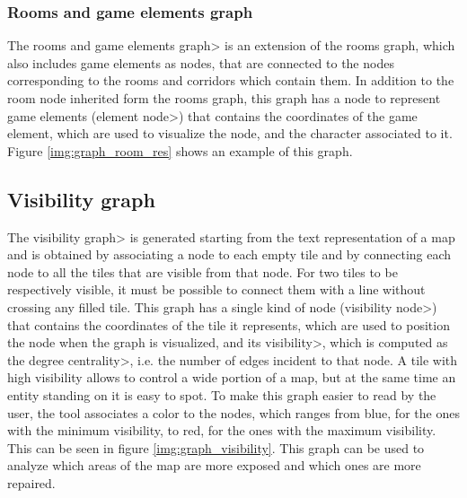\subsubsection{Rooms and game elements graph}

The \<rooms and game elements graph> is an extension of the rooms graph, which also includes game elements as nodes, that are connected to the nodes corresponding to the rooms and corridors which contain them. In addition to the room node inherited form the rooms graph, this graph has a node to represent game elements (\<element node>) that contains the coordinates of the game element, which are used to visualize the node, and the character associated to it. Figure \ref{img:graph_room_res} shows an example of this graph.

\subsection{Visibility graph}

The \<visibility graph> is generated starting from the text representation of a map and is obtained by associating a node to each empty tile and by connecting each node to all the tiles that are visible from that node. For two tiles to be respectively visible, it must be possible to connect them with a line without crossing any filled tile. This graph has a single kind of node (\<visibility node>) that contains the coordinates of the tile it represents, which are used to position the node when the graph is visualized, and its \<visibility>, which is computed as the \<degree centrality>, i.e. the number of edges incident to that node. A tile with high visibility allows to control a wide portion of a map, but at the same time an entity standing on it is easy to spot. To make this graph easier to read by the user, the tool associates a color to the nodes, which ranges from blue, for the ones with the minimum visibility, to red, for the ones with the maximum visibility. This can be seen in figure \ref{img:graph_visibility}. This graph can be used to analyze which areas of the map are more exposed and which ones are more repaired.

